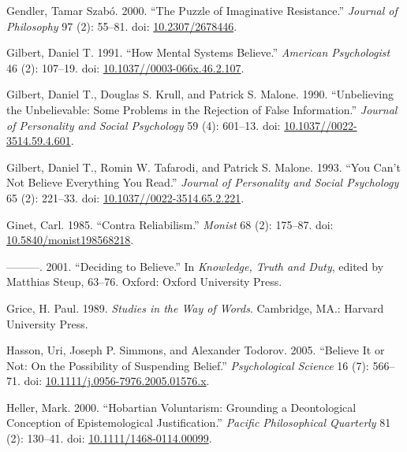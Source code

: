 \documentclass[
  10pt,
  letterpaper,
  DIV=11,
  numbers=noendperiod,
  twoside]{scrartcl}
\newlength{\cslhangindent}
\newenvironment{CSLReferences}[2] %
 {\begin{list}{}{%
  \setlength{\itemindent}{0pt}
  \setlength{\leftmargin}{0pt}
  \setlength{\parsep}{0pt}
  \ifodd #1
   \setlength{\leftmargin}{\cslhangindent}
   \setlength{\itemindent}{-1\cslhangindent}
  \fi
  \setlength{\itemsep}{#2\baselineskip}}}
 {\end{list}}
\begin{document}
\begin{CSLReferences}{1}{0}
Gendler, Tamar Szabó. 2000. {``The Puzzle of Imaginative Resistance.''}
\emph{Journal of Philosophy} 97 (2): 55--81. doi:
\href{https://doi.org/10.2307/2678446}{10.2307/2678446}.

Gilbert, Daniel T. 1991. {``How Mental Systems Believe.''}
\emph{American Psychologist} 46 (2): 107--19. doi:
\href{https://doi.org/10.1037//0003-066x.46.2.107}{10.1037//0003-066x.46.2.107}.

Gilbert, Daniel T., Douglas S. Krull, and Patrick S. Malone. 1990.
{``Unbelieving the Unbelievable: Some Problems in the Rejection of False
Information.''} \emph{Journal of Personality and Social Psychology} 59
(4): 601--13. doi:
\href{https://doi.org/10.1037//0022-3514.59.4.601}{10.1037//0022-3514.59.4.601}.

Gilbert, Daniel T., Romin W. Tafarodi, and Patrick S. Malone. 1993.
{``You Can't Not Believe Everything You Read.''} \emph{Journal of
Personality and Social Psychology} 65 (2): 221--33. doi:
\href{https://doi.org/10.1037//0022-3514.65.2.221}{10.1037//0022-3514.65.2.221}.

Ginet, Carl. 1985. {``Contra Reliabilism.''} \emph{Monist} 68 (2):
175--87. doi:
\href{https://doi.org/10.5840/monist198568218}{10.5840/monist198568218}.

---------. 2001. {``Deciding to Believe.''} In \emph{Knowledge, Truth
and Duty}, edited by Matthias Steup, 63--76. Oxford: Oxford University
Press.

Grice, H. Paul. 1989. \emph{Studies in the Way of Words}. Cambridge,
MA.: Harvard University Press.

Hasson, Uri, Joseph P. Simmons, and Alexander Todorov. 2005. {``Believe
It or Not: On the Possibility of Suspending Belief.''}
\emph{Psychological Science} 16 (7): 566--71. doi:
\href{https://doi.org/10.1111/j.0956-7976.2005.01576.x}{10.1111/j.0956-7976.2005.01576.x}.

Heller, Mark. 2000. {``Hobartian Voluntarism: Grounding a Deontological
Conception of Epistemological Justification.''} \emph{Pacific
Philosophical Quarterly} 81 (2): 130--41. doi:
\href{https://doi.org/10.1111/1468-0114.00099}{10.1111/1468-0114.00099}.


\end{CSLReferences}
\end{document}
